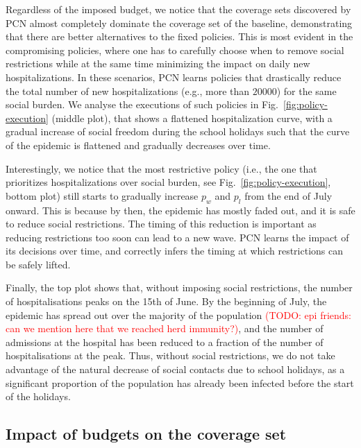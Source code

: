 \documentclass{article}
\newcommand\todo[1]{\textcolor{red}{(TODO: #1)}}
\begin{document}
Regardless of the imposed budget, we notice that the coverage sets discovered by PCN almost completely dominate the coverage set of the baseline, demonstrating that there are better alternatives to the fixed policies. This is most evident in the compromising policies, where one has to carefully choose when to remove social restrictions while at the same time minimizing the impact on daily new hospitalizations. In these scenarios, PCN learns policies that drastically reduce the total number of new hospitalizations (e.g., more than $20000$) for the same social burden. We analyse the executions of such policies in Fig.~\ref{fig:policy-execution} (middle plot), that shows a flattened hospitalization curve, with a gradual increase of social freedom during the school holidays such that the curve of the epidemic is flattened and gradually decreases over time.

Interestingly, we notice that the most restrictive policy (i.e., the one that prioritizes hospitalizations over social burden, see Fig.~\ref{fig:policy-execution}, bottom plot) still starts to gradually increase $p_w$ and $p_l$ from the end of July onward. This is because by then, the epidemic has mostly faded out, and it is safe to reduce social restrictions. The timing of this reduction is important as reducing restrictions too soon can lead to a new wave. PCN learns the impact of its decisions over time, and correctly infers the timing at which restrictions can be safely lifted.

Finally, the top plot shows that, without imposing social restrictions, the number of hospitalisations peaks on the 15th of June. By the beginning of July, the epidemic has spread out over the majority of the population \todo{epi friends: can we mention here that we reached herd immunity?}, and the number of admissions at the hospital has been reduced to a fraction of the number of hospitalisations at the peak. Thus, without social restrictions, we do not take advantage of the natural decrease of social contacts due to school holidays, as a significant proportion of the population has already been infected before the start of the holidays.

\subsection{Impact of budgets on the coverage set}
\end{document}
